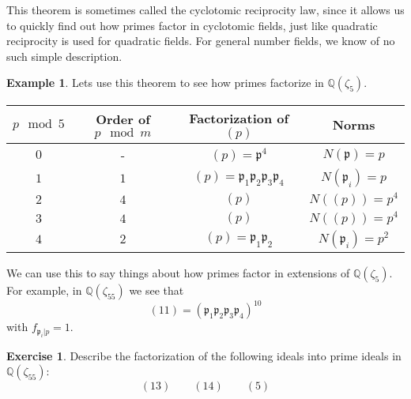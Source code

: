 \documentclass[11pt,a4paper]{report}
\theoremstyle{plain}
\theoremstyle{definition}
\newtheorem{exmp}[subsection]{Example}
\theoremstyle{definition}
\newtheorem{question}[subsection]{Exercise}
\def\QQ{\mathbb{Q}}
\def\gothp{\mathfrak{p}}
\begin{document}
	
	
	This theorem is sometimes called the cyclotomic reciprocity law, since it allows us to quickly find out how primes factor in cyclotomic fields, just like quadratic reciprocity is used for quadratic fields. For general number fields, we know of no such simple description.
	
	
	\begin{exmp}
		Lets use this theorem to see how primes factorize in $\QQ(\zeta_5)$. 
		\begin{center}
			\begin{tabular}{ |c | c |  c |  c |}
				\hline
				
				$p \mod 5$ & Order of  $p \mod m$ & Factorization of $(p)$ & Norms   \\ \hline
				$0$ & - & $(p)=\gothp^4$ & $N(\gothp)=p$ \\  \hline
				$1$ & $1$ & $(p)=\gothp_1\gothp_2\gothp_3\gothp_4$ & $N(\gothp_i)=p$ \\  \hline
				$2$ & $4$ & $(p)$ & $N((p))=p^4$ \\  \hline
				$3$ & $4$ & $(p)$ & $N((p))=p^4$ \\  \hline	
				$4$ & $2$& $(p)=\gothp_{1}\gothp_2$& $N(\gothp_i)=p^2$ \\  \hline
				
			\end{tabular}			
		\end{center}
		
		We can use this to say things about how primes factor in extensions of $\QQ(\zeta_5)$. For example, in $\QQ(\zeta_{55})$ we see that \[(11)=(\gothp_1\gothp_2\gothp_3\gothp_4)^{10}\] with $f_{\gothp_i|p}=1$.
		
	\end{exmp}
	
	\begin{question}
		Describe the factorization of the following ideals into prime ideals  in $\QQ(\zeta_{55})$:
		\[(13) \qquad (14) \qquad (5) \]
	\end{question}
	
\end{document}
